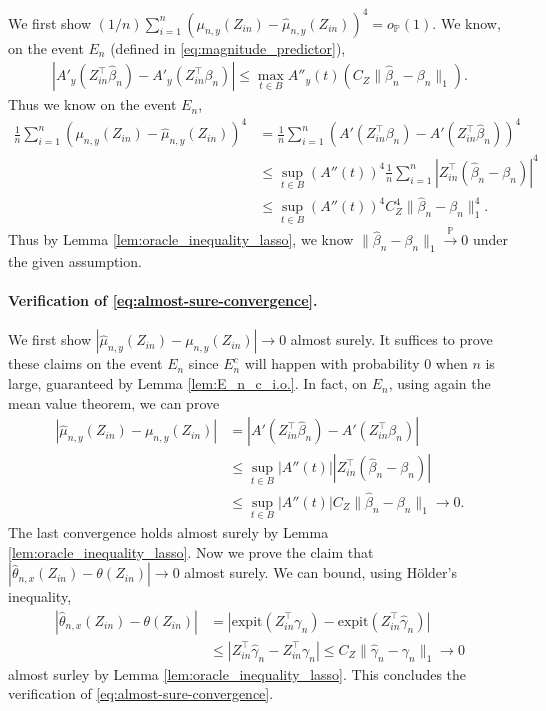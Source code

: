 \documentclass[12pt]{article}
\theoremstyle{definition}
\def\P{\mathbb{P}}
\def\P{\mathbb{P}}
\renewcommand{\P}{\mathbb{P}}							%
\newcommand{\expit}{\mathrm{expit}}                 	%
\newcommand{\convp}{\overset{\mathbb{P}}{\rightarrow}}             %
\newcommand{\srz}{Z}									%
\begin{document}
We first show $(1/n)\sum_{i=1}^n (\mu_{n,y}(\srz_{in})-\widehat{\mu}_{n,y}(\srz_{in}))^4=o_\P(1)$. We know, on the event $E_n$ (defined in \eqref{eq:magnitude_predictor}),
\begin{align*}
  |A'_y(\srz_{in}^\top\widehat{\beta}_n)-A'_y(\srz_{in}^\top\beta_n)|\leq \max_{t\in B}A''_y(t)(C_Z\|\widehat{\beta}_n-\beta_n\|_1).
\end{align*}
Thus we know on the event $E_n$, 
\begin{align*}
  \frac{1}{n}\sum_{i=1}^n (\mu_{n,y}(\srz_{in})-\widehat{\mu}_{n,y}(\srz_{in}))^4
  &
  =\frac{1}{n}\sum_{i=1}^n (A'(\srz_{in}^\top\beta_n)-A'(\srz_{in}^\top\widehat{\beta}_n))^4\\
  &
  \leq \sup_{t\in B}(A''(t))^4\frac{1}{n}\sum_{i=1}^n |\srz_{in}^\top(\widehat{\beta}_n-\beta_n)|^4\tag{Mean value theorem}\\
  &
  \leq \sup_{t\in B}(A''(t))^4C_Z^4\|\widehat{\beta}_n-\beta_n\|_1^4.\tag{H\"older's inequality}
\end{align*}
Thus by Lemma \ref{lem:oracle_inequality_lasso}, we know $\|\widehat{\beta}_n-\beta_n\|_1\convp 0$ under the given assumption.

\paragraph{Verification of \eqref{eq:almost-sure-convergence}.}

We first show $|\widehat{\mu}_{n,y}(\srz_{in})-\mu_{n,y}(\srz_{in})|\rightarrow 0$ almost surely. It suffices to prove these claims on the event $E_n$ since $E_n^c$ will happen with probability $0$ when $n$ is large, guaranteed by Lemma \ref{lem:E_n_c_i.o.}. In fact, on $E_n$, using again the mean value theorem, we can prove
\begin{align*}
  |\widehat{\mu}_{n,y}(\srz_{in})-\mu_{n,y}(\srz_{in})|
  &
  =|A'(\srz_{in}^\top\widehat{\beta}_n)-A'(\srz_{in}^\top\beta_n)|\\
  &
  \leq \sup_{t\in B}|A''(t)||\srz_{in}^\top(\widehat{\beta}_n-\beta_n)|\\
  &
  \leq \sup_{t\in B}|A''(t)|C_Z\|\widehat{\beta}_n-\beta_n\|_1\rightarrow 0.
\end{align*}
The last convergence holds almost surely by Lemma \ref{lem:oracle_inequality_lasso}. Now we prove the claim that $|\widehat{\theta}_{n,x}(\srz_{in})-\theta(\srz_{in})|\rightarrow0$ almost surely. We can bound, using H\"older's inequality,
\begin{align*}
  |\widehat{\theta}_{n,x}(\srz_{in})-\theta(\srz_{in})|
  &
  =|\expit(\srz_{in}^\top\gamma_n)-\expit(\srz_{in}^\top\widehat\gamma_n)|\\
  &
  \leq |\srz_{in}^\top\widehat{\gamma}_n-\srz_{in}^\top\gamma_n|\leq C_Z\|\widehat{\gamma}_n-\gamma_n\|_1\rightarrow 0
\end{align*}
almost surley by Lemma \ref{lem:oracle_inequality_lasso}. This concludes the verification of \eqref{eq:almost-sure-convergence}.
\end{document}
